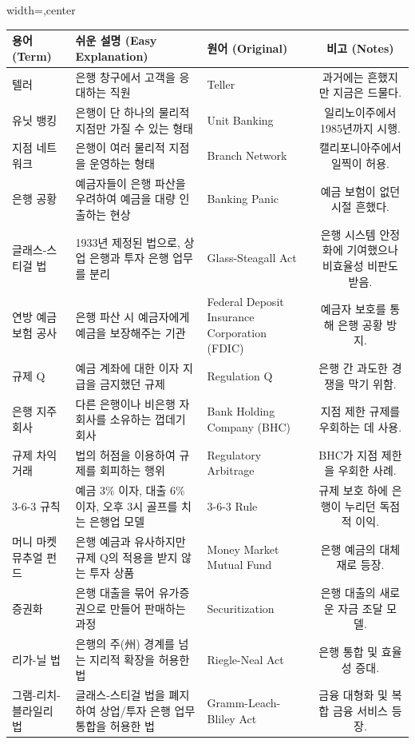 \documentclass[11pt,a4paper]{article}
\begin{document}
\begin{adjustbox}{width=\textwidth,center}
\begin{tabular}{lllc}
\toprule
\textbf{용어 (Term)} & \textbf{쉬운 설명 (Easy Explanation)} & \textbf{원어 (Original)} & \textbf{비고 (Notes)} \\
\midrule
텔러 & 은행 창구에서 고객을 응대하는 직원 & Teller & 과거에는 흔했지만 지금은 드물다. \\
유닛 뱅킹 & 은행이 단 하나의 물리적 지점만 가질 수 있는 형태 & Unit Banking & 일리노이주에서 1985년까지 시행. \\
지점 네트워크 & 은행이 여러 물리적 지점을 운영하는 형태 & Branch Network & 캘리포니아주에서 일찍이 허용. \\
은행 공황 & 예금자들이 은행 파산을 우려하여 예금을 대량 인출하는 현상 & Banking Panic & 예금 보험이 없던 시절 흔했다. \\
글래스-스티걸 법 & 1933년 제정된 법으로, 상업 은행과 투자 은행 업무를 분리 & Glass-Steagall Act & 은행 시스템 안정화에 기여했으나 비효율성 비판도 받음. \\
연방 예금 보험 공사 & 은행 파산 시 예금자에게 예금을 보장해주는 기관 & Federal Deposit Insurance Corporation (FDIC) & 예금자 보호를 통해 은행 공황 방지. \\
규제 Q & 예금 계좌에 대한 이자 지급을 금지했던 규제 & Regulation Q & 은행 간 과도한 경쟁을 막기 위함. \\
은행 지주 회사 & 다른 은행이나 비은행 자회사를 소유하는 껍데기 회사 & Bank Holding Company (BHC) & 지점 제한 규제를 우회하는 데 사용. \\
규제 차익 거래 & 법의 허점을 이용하여 규제를 회피하는 행위 & Regulatory Arbitrage & BHC가 지점 제한을 우회한 사례. \\
3-6-3 규칙 & 예금 3\% 이자, 대출 6\% 이자, 오후 3시 골프를 치는 은행업 모델 & 3-6-3 Rule & 규제 보호 하에 은행이 누리던 독점적 이익. \\
머니 마켓 뮤추얼 펀드 & 은행 예금과 유사하지만 규제 Q의 적용을 받지 않는 투자 상품 & Money Market Mutual Fund & 은행 예금의 대체재로 등장. \\
증권화 & 은행 대출을 묶어 유가증권으로 만들어 판매하는 과정 & Securitization & 은행 대출의 새로운 자금 조달 모델. \\
리가-닐 법 & 은행의 주(州) 경계를 넘는 지리적 확장을 허용한 법 & Riegle-Neal Act & 은행 통합 및 효율성 증대. \\
그램-리치-블라일리 법 & 글래스-스티걸 법을 폐지하여 상업/투자 은행 업무 통합을 허용한 법 & Gramm-Leach-Bliley Act & 금융 대형화 및 복합 금융 서비스 등장. \\

\end{tabular}
\end{adjustbox}
\end{document}
